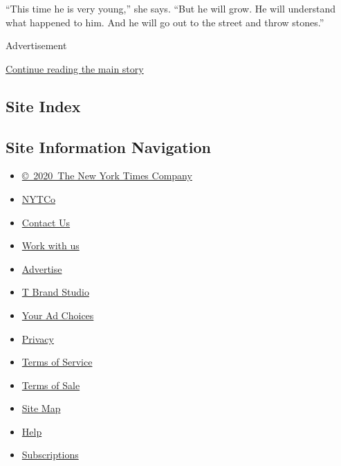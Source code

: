 ``This time he is very young,'' she says. ``But he will grow. He will
understand what happened to him. And he will go out to the street and
throw stones.''

Advertisement

\protect\hyperlink{after-bottom}{Continue reading the main story}

\hypertarget{site-index}{%
\subsection{Site Index}\label{site-index}}

\hypertarget{site-information-navigation}{%
\subsection{Site Information
Navigation}\label{site-information-navigation}}

\begin{itemize}
\tightlist
\item
  \href{https://help.nytimes.com/hc/en-us/articles/115014792127-Copyright-notice}{©~2020~The
  New York Times Company}
\end{itemize}

\begin{itemize}
\tightlist
\item
  \href{https://www.nytco.com/}{NYTCo}
\item
  \href{https://help.nytimes.com/hc/en-us/articles/115015385887-Contact-Us}{Contact
  Us}
\item
  \href{https://www.nytco.com/careers/}{Work with us}
\item
  \href{https://nytmediakit.com/}{Advertise}
\item
  \href{http://www.tbrandstudio.com/}{T Brand Studio}
\item
  \href{https://www.nytimes.com/privacy/cookie-policy\#how-do-i-manage-trackers}{Your
  Ad Choices}
\item
  \href{https://www.nytimes.com/privacy}{Privacy}
\item
  \href{https://help.nytimes.com/hc/en-us/articles/115014893428-Terms-of-service}{Terms
  of Service}
\item
  \href{https://help.nytimes.com/hc/en-us/articles/115014893968-Terms-of-sale}{Terms
  of Sale}
\item
  \href{https://spiderbites.nytimes.com}{Site Map}
\item
  \href{https://help.nytimes.com/hc/en-us}{Help}
\item
  \href{https://www.nytimes.com/subscription?campaignId=37WXW}{Subscriptions}
\end{itemize}
